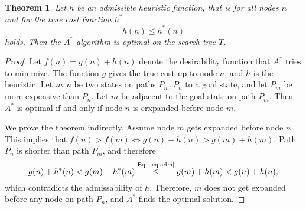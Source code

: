 \documentclass[11pt,a4paper]{scrartcl}
\newtheorem*{theorem}{Theorem}
\begin{document}
\begin{theorem}
Let $h$ be an admissible heuristic function, that is for all nodes $n$ and for the 
true cost function $h^*$ 
\begin{equation}\label{eq:adm}
h(n)\leq h^*(n)
\end{equation}
holds. Then the $A^*$ algorithm is optimal on the search tree $T$.
\end{theorem}
\begin{proof}
Let $f(n) = g(n) + h(n)$ denote the desirability function that $A^*$ tries to 
minimize. The function $g$ gives the true cost up to node $n$, and $h$ is the 
heuristic. Let $m,n$ be two states on paths $P_m, P_n$ to a goal state, and let 
$P_m$ be more expensive than $P_n$. Let $m$ be adjacent to the goal state on path 
$P_m$. Then $A^*$ is optimal if and only if node $n$ is erxpanded before node $m$.  

We prove the theorem indirectly. Assume node $m$ gets expanded before node $n$. 
This implies that $f(n)>f(m)\Leftrightarrow g(n) + h(n) > g(m) + h(m)$. Path $P_n$
is shorter than path $P_m$, and therefore 
\begin{equation}
g(n)+h^*(n) < g(m) + h^*(m) \stackrel{\text{Eq. \ref{eq:adm}}}{\leq} g(m) + h(m) < g(n) + h(n), 
\end{equation}
which contradicts the admissability of $h$. Therefore, $m$ does not get expanded before any node on 
path $P_n$, and $A^*$ finds the optimal solution. 
\end{proof}
%
%
\end{document}
